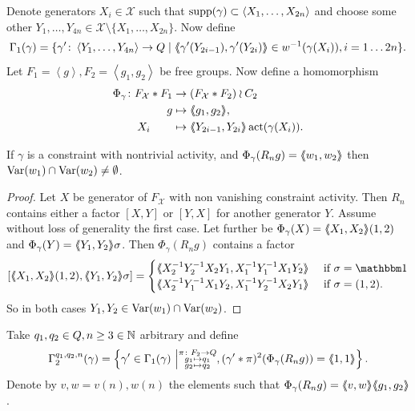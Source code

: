 \documentclass[a4paper,11pt]{amsart}
\begin{document}
 Denote generators $X_i\in\mathcal{X}$ such that $\operatorname{{supp}}(\gamma) \subset \left<X_1,\dotsc,X_{2n}\right>$ and choose some 
 other $Y_1,\dotsc,Y_{4n} \in\mathcal{X} \setminus \{X_1,\dotsc,X_{2n}\}$. 
 Now define
 \[\Gamma_1(\gamma) = \{\gamma' \colon \left< Y_1,\ldots ,Y_{4n}\right> \to Q \mid \langle\negthickspace\langle\gamma'(Y_{2i-1}),\gamma'(Y_{2i})\rangle\negthickspace\rangle\in w^{-1}(\gamma(X_i)),i=1\ldots2n\}.\] 
 Let $F_1=\left<g\right>,F_2=\left<g_1,g_2\right>$ be free groups. 
 Now define a homomorphism  
 \begin{align*}
  \Phi_{\gamma}\colon F_{\mathcal{X}}*F_1 &\to (F_{\mathcal{X}}*F_2)\wr C_2 \\ g&\mapsto \langle\negthickspace\langle g_1,g_2\rangle\negthickspace\rangle,\\ X_i\qquad &\mapsto \langle\negthickspace\langle Y_{2i-1},Y_{2i}\rangle\negthickspace\rangle\operatorname{act}(\gamma(X_i)).
 \end{align*}
\begin{lem} \label{lem:commonVar}
 If $\gamma$ is a constraint with nontrivial activity, and $\Phi_\gamma(R_ng)=\langle\negthickspace\langle w_1,w_2\rangle\negthickspace\rangle$ 
 then $\textup{Var}(w_1)\cap\textup{Var}(w_2)\neq \emptyset$.
\end{lem}
\begin{proof}
 Let $X$ be generator of $F_{\mathcal{X}}$ with non vanishing constraint activity. 
 Then $R_n$ contains either a factor $[X,Y]$ or $[Y,X]$ for another generator $Y$. 
 Assume without loss of generality the first case. Let further be 
 $\Phi_\gamma(X)=\langle\negthickspace\langle X_1,X_2\rangle\negthickspace\rangle(1,2)$ and $\Phi_\gamma(Y)=\langle\negthickspace\langle Y_1,Y_2\rangle\negthickspace\rangle\sigma$. 
 Then $\Phi_\gamma(R_n g)$ contains a factor 
 \[ [\pair{X_1,X_2}(1,2),\pair{Y_1,Y_2}\sigma] = \begin{cases}
                                                   \pair{X_2^{-1}Y_2^{-1}X_2Y_1,X_1^{-1}Y_1^{-1}X_1Y_2} & \textup{ if } \sigma=\id \\
                                                   \pair{X_2^{-1}Y_1^{-1}X_1Y_2,X_1^{-1}Y_2^{-1}X_2Y_1} & \textup{ if } \sigma=(1,2) . \\
                                                 \end{cases}
\] So in both cases $Y_1,Y_2\in \textup{Var}(w_1)\cap \textup{Var}(w_2)$. 
\end{proof}
Take $q_1,q_2 \in Q,n\geq3\in \mathbb{N}$ arbitrary and define
 \[\Gamma_2^{q_1,q_2,n}(\gamma) = \left\{\gamma'\in \Gamma_1(\gamma) \ \middle \vert \substack{\pi\colon F_2\to Q\\
										g_1\mapsto q_1 \\
										g_2\mapsto q_2 }, (\gamma'*\pi)^2(\Phi_\gamma(R_ng))=\langle\negthickspace\langle1,1\rangle\negthickspace\rangle\right\}.\] 
 Denote by $v,w=v(n),w(n)$ the elements such that $\Phi_\gamma(R_ng)=\langle\negthickspace\langle v,w\rangle\negthickspace\rangle\langle\negthickspace\langle g_1,g_2\rangle\negthickspace\rangle$.
\end{document}
